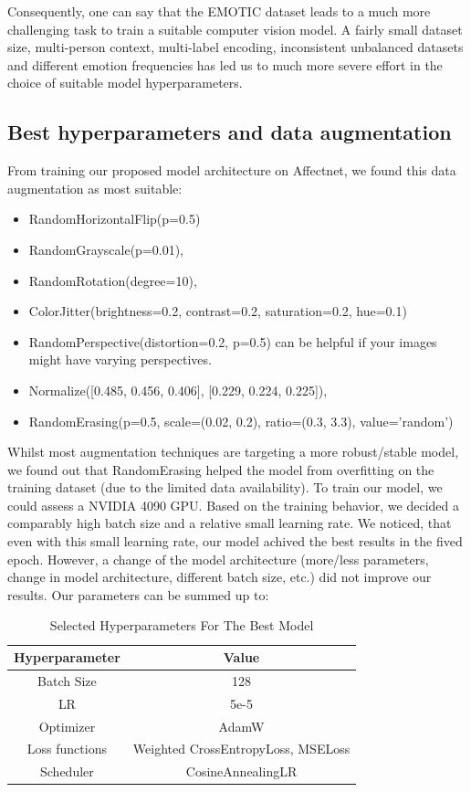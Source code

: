 \documentclass[conference]{IEEEtran}
\begin{document}
Consequently, one can say that the EMOTIC dataset leads to a much more challenging task to train a suitable computer vision model. A fairly small dataset size, multi-person context, multi-label encoding, inconsistent unbalanced datasets and different emotion frequencies has led us to much more severe effort in the choice of suitable model hyperparameters.

\subsection{Best hyperparameters and data augmentation}

From training our proposed model architecture on Affectnet, we found this data augmentation as most suitable:
\begin{itemize}
\item RandomHorizontalFlip(p=0.5)
\item RandomGrayscale(p=0.01),
\item RandomRotation(degree=10), 
\item ColorJitter(brightness=0.2, contrast=0.2, saturation=0.2, hue=0.1)
\item RandomPerspective(distortion=0.2, p=0.5) can be helpful if your images might have varying perspectives.
\item Normalize([0.485, 0.456, 0.406], [0.229, 0.224, 0.225]),
\item RandomErasing(p=0.5, scale=(0.02, 0.2), ratio=(0.3, 3.3), value='random') 
\end{itemize}

Whilst most augmentation techniques are targeting a more robust/stable model, we found out that RandomErasing helped the model from overfitting on the training dataset (due to the limited data availability). To train our model, we could assess a NVIDIA 4090 GPU. Based on the training behavior, we decided a comparably high batch size and a relative small learning rate. We noticed, that even with this small learning rate, our model achived the best results in the fived epoch. However, a change of the model architecture (more/less parameters, change in model architecture, different batch size, etc.) did not improve our results. Our parameters can be summed up to: 
\begin{table}[htbp]
\centering
\begin{tabular}{c | c }
 \textbf{Hyperparameter} & \textbf{Value} \\ 
  \hline
 Batch Size & 128 \\
 \hline 
 LR & 5e-5 \\
 \hline
  Optimizer & AdamW \\
 \hline
 Loss functions & Weighted CrossEntropyLoss, MSELoss \\
 \hline
 Scheduler & CosineAnnealingLR \\
\end{tabular}
\caption{Selected Hyperparameters For The Best Model}
\label{tab:hyperparameters}
\end{table}
\end{document}
